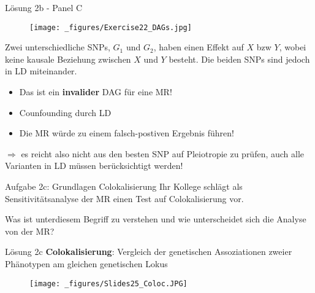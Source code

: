 \documentclass{beamer}
\begin{document}
\begin{frame}{Lösung 2b - Panel C}
\begin{figure}[h]
\begin{center}
\texttt{[image: \_figures/Exercise22\_DAGs.jpg]}
\label{fig:DAGsC}
\end{center}
\end{figure}

Zwei unterschiedliche SNPs, $G_1$ und $G_2$, haben einen Effekt auf $X$ bzw $Y$, wobei keine kausale Beziehung zwischen $X$ und $Y$ besteht. Die beiden SNPs sind jedoch in LD miteinander. 

\begin{itemize}
    \item Das ist ein \textbf{invalider} DAG für eine MR! 
    \item Counfounding durch LD
    \item Die MR würde zu einem falsch-postiven Ergebnis führen!
\end{itemize} 

$\Rightarrow$ es reicht also nicht aus den besten SNP auf Pleiotropie zu prüfen, auch alle Varianten in LD müssen berücksichtigt werden!
\end{frame}

\begin{frame}{Aufgabe 2c: Grundlagen Colokalisierung}
Ihr Kollege schlägt als Sensitivitätsanalyse der MR einen Test auf Colokalisierung vor. 

Was ist unterdiesem Begriff zu verstehen und wie unterscheidet sich die Analyse von der MR?

\end{frame}

\begin{frame}{Lösung 2c}
\textbf{Colokalisierung}: Vergleich der genetischen Assoziationen zweier Phänotypen am gleichen genetischen Lokus

\begin{figure}[h]
\begin{center}
\texttt{[image: \_figures/Slides25\_Coloc.JPG]}
\label{fig:Coloc}
\end{center}
\end{figure}

\end{frame}
\end{document}
